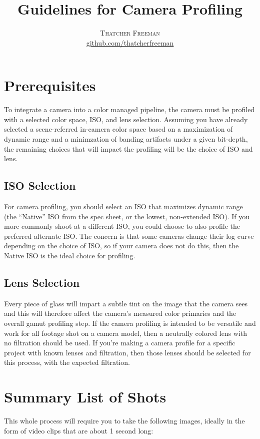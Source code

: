 \documentclass[twoside]{article}
\title{Guidelines for Camera Profiling} %
\author{%
    \textsc{Thatcher Freeman} \\[1ex] %
    \normalsize \href{https://github.com/thatcherfreeman}{github.com/thatcherfreeman}
}
\date{}%
\begin{document}
\maketitle
\thispagestyle{fancy}

\tableofcontents

\section{Prerequisites}
To integrate a camera into a color managed pipeline, the camera must be profiled with a selected color space, ISO, and lens selection. Assuming you have already selected a scene-referred in-camera color space based on a maximization of dynamic range and a minimzation of banding artifacts under a given bit-depth, the remaining choices that will impact the profiling will be the choice of ISO and lens.

\subsection{ISO Selection}
For camera profiling, you should select an ISO that maximizes dynamic range (the ``Native'' ISO from the spec sheet, or the lowest, non-extended ISO). If you more commonly shoot at a different ISO, you could choose to also profile the preferred alternate ISO. The concern is that some cameras change their log curve depending on the choice of ISO, so if your camera does not do this, then the Native ISO is the ideal choice for profiling.

\subsection{Lens Selection}
Every piece of glass will impart a subtle tint on the image that the camera sees and this will therefore affect the camera's measured color primaries and the overall gamut profiling step. If the camera profiling is intended to be versatile and work for all footage shot on a camera model, then a neutrally colored lens with no filtration should be used. If you're making a camera profile for a specific project with known lenses and filtration, then those lenses should be selected for this process, with the expected filtration.

\newpage \section{Summary List of Shots}
This whole process will require you to take the following images, ideally in the form of video clips that are about 1 second long:
\end{document}
